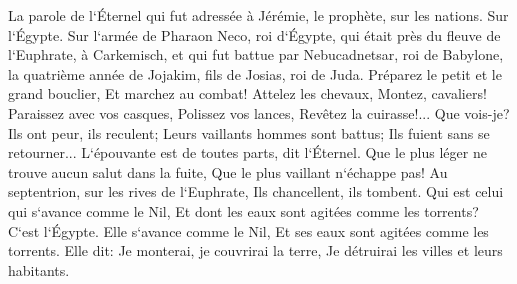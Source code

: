 \verse La parole de l`Éternel qui fut adressée à Jérémie, le prophète, sur les nations. 
\verse Sur l`Égypte. Sur l`armée de Pharaon Neco, roi d`Égypte, qui était près du fleuve de l`Euphrate, à Carkemisch, et qui fut battue par Nebucadnetsar, roi de Babylone, la quatrième année de Jojakim, fils de Josias, roi de Juda. 
\verse Préparez le petit et le grand bouclier, Et marchez au combat! 
\verse Attelez les chevaux, Montez, cavaliers! Paraissez avec vos casques, Polissez vos lances, Revêtez la cuirasse!... 
\verse Que vois-je? Ils ont peur, ils reculent; Leurs vaillants hommes sont battus; Ils fuient sans se retourner... L`épouvante est de toutes parts, dit l`Éternel. 
\verse Que le plus léger ne trouve aucun salut dans la fuite, Que le plus vaillant n`échappe pas! Au septentrion, sur les rives de l`Euphrate, Ils chancellent, ils tombent. 
\verse Qui est celui qui s`avance comme le Nil, Et dont les eaux sont agitées comme les torrents? 
\verse C`est l`Égypte. Elle s`avance comme le Nil, Et ses eaux sont agitées comme les torrents. Elle dit: Je monterai, je couvrirai la terre, Je détruirai les villes et leurs habitants. 
